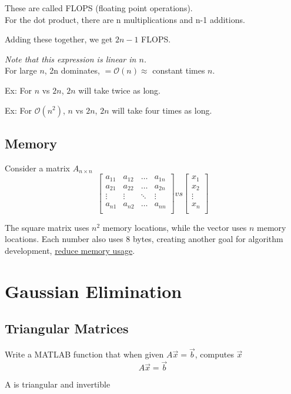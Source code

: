 \documentclass[12pt, letterpaper]{article}
\begin{document}
\noindent These are called FLOPS (floating point operations). \\

\noindent For the dot product, there are n multiplications and n-1 additions.

Adding these together, we get $2n-1$ FLOPS.

\textit{Note that this expression is linear in $n$.} \\

\noindent For large $n$, 2n dominates,
$=\mathcal{O}(n) \approx $ constant times $n$.

Ex: For $n$ vs $2n$, $2n$ will take twice as long.

Ex: For $\mathcal{O}(n^2)$, $n$ vs $2n$, $2n$ will take four times as long.

\subsection{Memory}
\noindent Consider a matrix $A_{n\times n}$
\[
\begin{bmatrix}
    a_{11} & a_{12} & \ldots & a_{1n} \\
    a_{21} & a_{22} & \ldots & a_{2n} \\
    \vdots & \vdots & \ddots & \vdots \\
    a_{n1} & a_{n2} & \ldots & a_{nn} \\
\end{bmatrix}
vs
\begin{bmatrix}
    x_1 \\
    x_2 \\
    \vdots \\
    x_n \\
\end{bmatrix}
\]

The square matrix uses $n^2$ memory locations, while the vector uses $n$ memory locations.
Each number also uses 8 bytes, creating another goal for algorithm development, \underline{reduce memory usage}.


\section{Gaussian Elimination}
\subsection{Triangular Matrices}
\noindent Write a MATLAB function that when given $A\vec{x}=\vec{b}$, computes $\vec{x}$
\[
A\vec{x} = \vec{b} 
\]
\begin{center}
A is triangular and invertible
\end{center}
\end{document}
